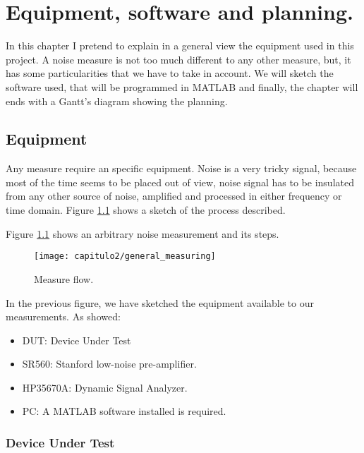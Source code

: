 \chapter{Equipment, software and planning.}
\label{cap:equipment_software_and_planning}

In this chapter I pretend to explain in a general view the equipment used in this project. A noise measure is not too much different to any other measure, but, it has some particularities that we have to take in account. We will sketch the software used, that will be programmed in MATLAB and finally, the chapter will ends with a Gantt's diagram showing the planning.

\section{Equipment}

Any measure require an specific equipment. Noise is a very tricky signal, because most of the time seems to be placed out of view, noise signal has to be insulated from any other source of noise, amplified and processed in either frequency or time domain. Figure \ref{fig:general_measuring} shows a sketch of the process described.


Figure \ref{fig:general_measuring} shows an arbitrary noise measurement and its steps.

\smallskip	
\begin{figure}[H]%
\noindent \begin{centering}
\texttt{[image: capitulo2/general\_measuring]}
\par\end{centering}
\smallskip
\caption{\label{fig:general_measuring} Measure flow.}
\end{figure}

In the previous figure, we have sketched the equipment available to our measurements. As showed:

\begin{itemize}
	\item DUT: Device Under Test
	\item SR560: Stanford low-noise pre-amplifier.
	\item HP35670A: Dynamic Signal Analyzer.
	\item PC: A MATLAB software installed is required.
\end{itemize}

\subsection{Device Under Test}
